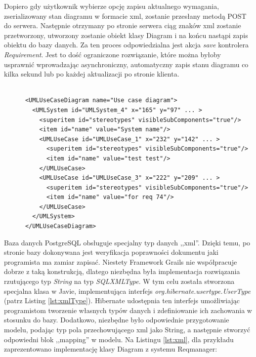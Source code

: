       Dopiero gdy użytkownik wybierze opcję zapisu aktualnego wymagania, zserializowany stan diagramu w formacie xml, zostanie przesłany metodą POST do serwera. Następnie otrzymany po stronie serwera ciąg znaków xml zostanie przetworzony, utworzony zostanie obiekt klasy Diagram i na końcu nastąpi zapis obiektu do bazy danych. Za ten proces odpowiedzialna jest akcja \emph{save} kontrolera \emph{Requirement}. Jest to dość ograniczone rozwiązanie, które można byłoby usprawnić wprowadzając asynchroniczny, automatyczny zapis stanu diagramu co kilka sekund lub po każdej aktualizacji po stronie klienta.

      \begin{lstlisting}[caption={Struktura xml diagramu}, label={lst:diagramXml}]

      <UMLUseCaseDiagram name="Use case diagram">
        <UMLSystem id="UMLSystem_4" x="165" y="97" ... >
          <superitem id="stereotypes" visibleSubComponents="true"/>
          <item id="name" value="System name"/>
          <UMLUseCase id="UMLUseCase_1" x="232" y="142" ... >
            <superitem id="stereotypes" visibleSubComponents="true"/>
            <item id="name" value="test test"/>
          </UMLUseCase>
          <UMLUseCase id="UMLUseCase_3" x="222" y="209" ... >
            <superitem id="stereotypes" visibleSubComponents="true"/>
            <item id="name" value="for req 74"/>
          </UMLUseCase>
        </UMLSystem>
      </UMLUseCaseDiagram>

      \end{lstlisting}

      Baza danych PostgreSQL obsługuje specjalny typ danych ,,xml''. Dzięki temu, po stronie bazy dokonywana jest weryfikacja poprawności dokumentu jaki programista ma zamiar zapisać. Niestety Framework Grails nie współpracuje dobrze z taką konstrukcją, dlatego niezbędna była implementacja rozwiązania rzutującego typ \emph{String} na typ \emph{SQLXMLType}. W tym celu została stworzona specjalna klasa w Javie, implementująca interfejs \emph{org.hibernate.usertype.UserType} (patrz Listing \ref{lst:xmlType}). Hibernate udostępnia ten interfejs umożliwiając programistom tworzenie własnych typów danych i zdefiniowanie ich zachowania w stosunku do bazy. Dodatkowo, niezbędne było odpowiednie przygotowanie modelu, podając typ pola przechowującego xml jako String, a następnie stworzyć odpowiedni blok ,,mapping'' w modelu. Na Listingu \ref{lst:xml}, dla przykładu zaprezentowano implementację klasy Diagram z systemu Reqmanager:
 
